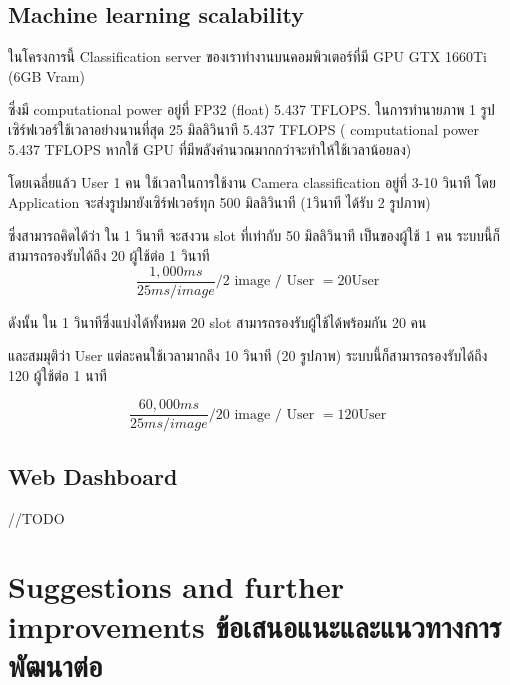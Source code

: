 \subsection{Machine learning scalability}


ในโครงการนี้ Classification server ของเราทำงานบนคอมพิวเตอร์ที่มี GPU GTX 1660Ti (6GB Vram)

ซึ่งมี  computational power อยู่ที่ FP32 (float) 5.437 TFLOPS.
ในการทำนายภาพ 1 รูป เซิร์ฟเวอร์ใช้เวลาอย่างนานที่สุด 25 มิลลิวินาที
5.437 TFLOPS ( computational power 5.437 TFLOPS หากใช้ GPU ที่มีพลังคำนวณมากกว่าจะทำให้ใช้เวลาน้อยลง)

โดยเฉลี่ยแล้ว User 1 คน ใช้เวลาในการใช้งาน Camera classification อยู่ที่ 3-10 วินาที
โดย Application จะส่งรูปมายังเซิร์ฟเวอร์ทุก 500 มิลลิวินาที (1วินาที ได้รับ 2 รูปภาพ)

ซึ่งสามารถคิดได้ว่า ใน 1 วินาที จะสงวน slot ที่เท่ากับ 50 มิลลิวินาที เป็นของผู้ใช้ 1 คน 
ระบบนี้ก็สามารถรองรับได้ถึง 20 ผู้ใช้ต่อ 1 วินาที
\begin{equation}
    {\frac {1,000 ms}{25 ms / image}}   / 2 \text{ image / User }  = 20 \text{User }
\end{equation}

ดังนั้น ใน 1 วินาทีซึ่งแบ่งได้ทั้งหมด 20  slot สามารถรองรับผู้ใช้ได้พร้อมกัน 20 คน

และสมมุติว่า User แต่ละคนใช้เวลามากถึง 10 วินาที (20 รูปภาพ) ระบบนี้ก็สามารถรองรับได้ถึง 120 ผู้ใช้ต่อ 1 นาที 


\begin{equation}
    {\frac {60,000 ms}{25 ms / image}}   / 20 \text{ image / User }  = 120 \text{User }
\end{equation}
 

\subsection{Web Dashboard}
//TODO 




\section{\ifenglish%
      Suggestions and further improvements
  \else%
      ข้อเสนอแนะและแนวทางการพัฒนาต่อ
  \fi
 }

